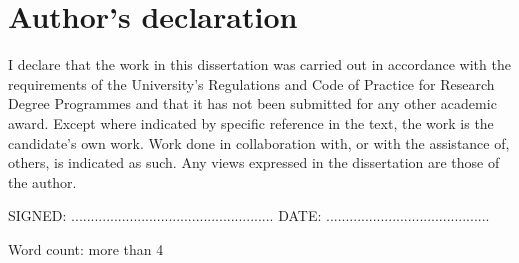 %
%
%
%
%
%
\chapter*{Author's declaration}
\hspace{-0.75cm}
\begin{SingleSpace}
\noindent I declare that the work in this dissertation was carried out in accordance with the requirements of  the University's Regulations and Code of Practice for Research Degree Programmes and that it  has not been submitted for any other academic award. Except where indicated by specific  reference in the text, the work is the candidate's own work. Work done in collaboration with, or with the assistance of, others, is indicated as such. Any views expressed in the dissertation are those of the author.

\vspace{3cm}
\noindent
\textsc{SIGNED: .................................................... DATE: ..........................................}

\vspace*{\fill}

\begin{flushright}
{\small Word count: more than 4}
\end{flushright}

\end{SingleSpace}
\clearpage